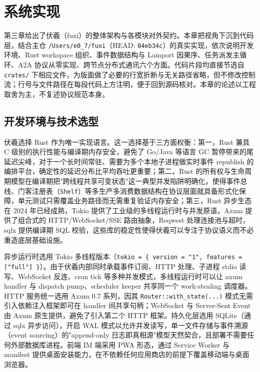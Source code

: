 
\section{系统实现}

第三章给出了伏羲（fuxi）的整体架构与各模块对外契约。本章把视角下沉到代码层，结合主仓 \texttt{/Users/e0\_7/fuxi}（HEAD: \texttt{04eb34c}）的真实实现，依次说明开发环境、Rust workspace 组织、事件数据结构与 Lamport 因果序、任务派发主循环、A2A 协议从零实现、跨节点分布式通讯六个方面。代码片段均直接节选自 \texttt{crates/} 下相应文件，为版面做了必要的行宽折断与无关路径省略，但不修改控制流；行号与文件路径在每段代码上方注明，便于回到源码核对。本章的论述以工程取舍为主，不复述协议规范本身。

\subsection{开发环境与技术选型}

伏羲选择 Rust 作为唯一实现语言。这一选择基于三方面权衡：第一，Rust 兼具 C 级别的执行性能与编译期内存安全，避免了 Go/Java 等语言 GC 暂停带来的尾延迟尖峰，对于一个长时间常驻、需要为多个本地子进程做实时事件 republish 的编排平台，确定性的延迟分布比平均吞吐更重要；第二，Rust 的所有权与生命周期模型在编译期把"跨线程共享可变状态"这一典型并发陷阱明确化，使得事件总线、门客注册表（\texttt{Shelf}）等多生产多消费数据结构在协议层面就具备形式化保障，单元测试只需覆盖业务路径而无需重复验证内存安全；第三，Rust 异步生态在 2024 年已经成熟，Tokio 提供了工业级的多线程运行时与并发原语\cite{tokio2024broadcast}，Axum 提供了组合式的 HTTP/WebSocket/SSE 路由抽象，Reqwest 处理连接池与超时，sqlx 提供编译期 SQL 校验，这些库的稳定性使得伏羲可以专注于协议语义而不必重造底层基础设施。

异步运行时选用 Tokio 多线程版本（\texttt{tokio = \{ version = "1", features = ["full"] \}}）。由于伏羲内部同时承载事件订阅、HTTP 处理、子进程 stdio 读写、WebSocket 反连、cron tick 等多种并发模式，多线程运行时可以让 axum handler 与 dispatch pump、scheduler keeper 共享同一个 work-stealing 调度器。HTTP 服务统一选用 Axum 0.7 系列，因其 \texttt{Router::with\_state(...)} 模式无需引入依赖注入框架即可在 handler 间共享句柄；WebSocket 与 Server-Sent Event 由 Axum 原生提供\cite{fette2011websocket}，避免了引入第二个 HTTP 框架。持久化层选用 SQLite（通过 sqlx 异步访问），开启 WAL 模式以允许并发读写\cite{sqlite2024wal}，单一文件存储与事件溯源（event sourcing）的"append-only 日志即真相源"模型天然契合，且部署不需要任何外部数据库进程。前端 IM 端采用 PWA 形态，通过 Service Worker 与 manifest 提供桌面安装能力，在不依赖任何应用商店的前提下覆盖移动端与桌面浏览器。

